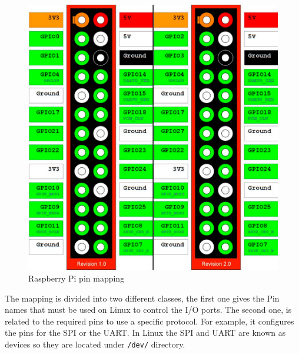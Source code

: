 \begin{figure}[H]\begin{center}
 \centering
  \captionsetup{justification=centering}
  \includegraphics[scale=0.30]{pictures/iosharp/mapping-raspberrypi}
  \caption{Raspberry Pi pin mapping\label{fig:mapping-rpi}}
\end{center}\end{figure}
The mapping is divided into two different classes, the first one gives the Pin names that must be used on Linux to control the I/O ports. The second one, is related to the required pins to use a specific protocol. For example, it configures the pins for the SPI or the UART. In Linux the SPI and UART are known as devices so they are located under \verb!/dev/! directory.